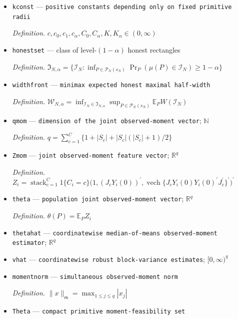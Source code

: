 \documentclass{article}
\begin{document}
\begin{itemize}
  \item \texttt{kconst} --- \texttt{positive constants depending only on fixed primitive radii}
  \par\smallskip\noindent\emph{Definition.} \(c,c_0,c_1,c_\alpha,C_0,C_\alpha,K,K_\alpha\in(0,\infty)\)
  \item \texttt{honestset} --- class of level-\((1-\alpha)\) honest rectangles
  \par\smallskip\noindent\emph{Definition.} \(\mathfrak I_{N,\alpha}=\{\mathcal I_N:\inf_{P\in\mathcal P_N(s_N)}\Pr_P(\mu(P)\in\mathcal I_N)\ge1-\alpha\}\)
  \item \texttt{widthfront} --- \texttt{minimax expected honest maximal half-\allowbreak{}width}
  \par\smallskip\noindent\emph{Definition.} \(\mathcal W_{N,\alpha}=\inf_{\mathcal I_N\in\mathfrak I_{N,\alpha}}\sup_{P\in\mathcal P_N(s_N)}\mathbb E_PW(\mathcal I_N)\)
  \item \texttt{qmom} --- \texttt{dimension of the joint observed-\allowbreak{}moment vector}; \(\mathbb N\)
  \par\smallskip\noindent\emph{Definition.} \(q=\sum_{c=1}^C\{1+|S_c|+|S_c|(|S_c|+1)/2\}\)
  \item \texttt{Zmom} --- \texttt{joint observed-\allowbreak{}moment feature vector}; \(\mathbb R^q\)
  \par\smallskip\noindent\emph{Definition.} \(Z_i=\operatorname{stack}_{c=1}^C 1\{C_i=c\}\bigl(1,(J_cY_i(0))^{\prime},\operatorname{vech}\{J_cY_i(0)Y_i(0)^{\prime}J_c^{\prime}\}^{\prime}\bigr)^{\prime}\)
  \item \texttt{theta} --- \texttt{population joint observed-\allowbreak{}moment vector}; \(\mathbb R^q\)
  \par\smallskip\noindent\emph{Definition.} \(\theta(P)=\mathbb E_P Z_i\)
  \item \texttt{thetahat} --- \texttt{coordinatewise median-\allowbreak{}of-\allowbreak{}means observed-\allowbreak{}moment estimator}; \(\mathbb R^q\)
  \item \texttt{vhat} --- \texttt{coordinatewise robust block-\allowbreak{}variance estimates}; \([0,\infty)^q\)
  \item \texttt{momentnorm} --- \texttt{simultaneous observed-\allowbreak{}moment norm}
  \par\smallskip\noindent\emph{Definition.} \(\|x\|_{\mathsf m}=\max_{1\le j\le q}|x_j|\)
  \item \texttt{Theta} --- \texttt{compact primitive moment-\allowbreak{}feasibility set}

\end{itemize}
\end{document}
